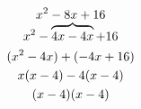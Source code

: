 \documentclass{article}
\begin{document}
\begin{gather*}
  x^2-8x + 16 \\[-1ex]
  x^2-\overbrace{\mathstrut 4x -4x} + 16\\
(x^2-4x)+(-4x+16)\\
x(x-4)-4(x-4)\\
(x-4)(x-4)
\end{gather*}
\end{document}
